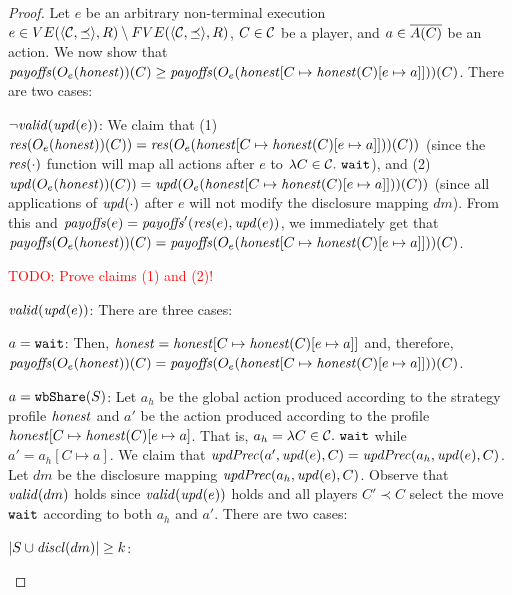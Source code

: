 \begin{proof}
Let $e$ be an arbitrary non-terminal execution $e \in VE(\tup{\coalitionSchema,\preceq},\rounds) \setminus FVE(\tup{\coalitionSchema,\preceq},\rounds)$, $C \in \coalitionSchema$ be a player, and $a \in \coalitionActions{C}$ be an action.
%
We now show that $\payoffs(\subgameOutcome{\honest}{e})(C) \geq \payoffs(\subgameOutcome{\honest[C \mapsto \honest(C)[e \mapsto a]]}{e})(C)$.
%
There are two cases:
\begin{compactitem}
\item[$\neg \valid{\update{e}}$: ]
%
We claim that (1) $\conflict{\subgameOutcome{\honest}{e})(C)} = \conflict{\subgameOutcome{\honest[C \mapsto \honest(C)[e \mapsto a]]}{e})(C)}$ (since the $\conflict{\cdot}$ function will map all actions after $e$ to $\lambda C \in \coalitionSchema.\ \wait$), and (2) $\update{\subgameOutcome{\honest}{e})(C)} = \update{\subgameOutcome{\honest[C \mapsto \honest(C)[e \mapsto a]]}{e})(C)}$ (since all applications of $\update{\cdot}$ after $e$ will not modify the disclosure mapping $dm$).
%
From this and $\payoffs(e) = \payoffs'(\conflict{e}, \update{e})$, we immediately get that $\payoffs(\subgameOutcome{\honest}{e})(C) = \payoffs(\subgameOutcome{\honest[C \mapsto \honest(C)[e \mapsto a]]}{e})(C)$.

\textcolor{red}{TODO: Prove claims (1) and (2)!}

\item[$\valid{\update{e}}$: ]
%
There are three cases:
\begin{compactitem}
\item[$a = \wait$:]
%
Then, $\honest = \honest[C \mapsto \honest(C)[e \mapsto a]]$ and, therefore, $\payoffs(\subgameOutcome{\honest}{e})(C) = \payoffs(\subgameOutcome{\honest[C \mapsto \honest(C)[e \mapsto a]]}{e})(C)$.

\item[$a = \wShare{S}$:]
%
Let $a_h$ be the global action produced according to the strategy profile $\honest$ and $a'$ be the action produced according to the profile $\honest[C \mapsto \honest(C)[e \mapsto a]$.
%
That is, $a_h = \lambda C \in \coalitionSchema.\ \wait$ while $a'= a_h[C \mapsto a]$.
%
We claim that  $ \updPrec{a'}{\update{e}}{C} =  \updPrec{a_h}{\update{e}}{C}$.
%
Let $dm$ be the disclosure mapping $\updPrec{a_h}{\update{e}}{C}$.
%
Observe that $\valid{dm}$ holds since $\valid{\update{e}}$ holds and all players $C' \prec C$ select the move $\wait$ according to both $a_h$ and $a'$.
%
There are two cases:
\begin{compactitem}
\item[$|S \cup \disclosed{dm}| \geq k$:]


\end{compactitem}
\end{compactitem}
\end{compactitem}
\end{proof}
